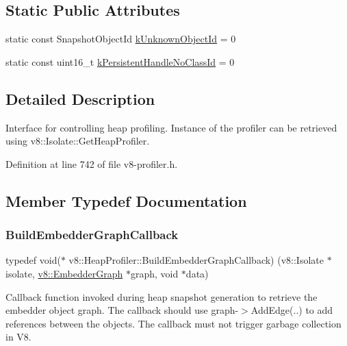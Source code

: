 \subsection*{Static Public Attributes}
\begin{DoxyCompactItemize}
\item 
static const Snapshot\+Object\+Id \mbox{\hyperlink{classv8_1_1HeapProfiler_abf2b9d8facb18473f9b124ab8baf5786}{k\+Unknown\+Object\+Id}} = 0
\item 
static const uint16\+\_\+t \mbox{\hyperlink{classv8_1_1HeapProfiler_a272c9af3ea5cd90a2737af3d22a7eb78}{k\+Persistent\+Handle\+No\+Class\+Id}} = 0
\end{DoxyCompactItemize}


\subsection{Detailed Description}
Interface for controlling heap profiling. Instance of the profiler can be retrieved using v8\+::\+Isolate\+::\+Get\+Heap\+Profiler. 

Definition at line 742 of file v8-\/profiler.\+h.



\subsection{Member Typedef Documentation}
\mbox{\label{classv8_1_1HeapProfiler_a29c98afa5ce0ea543eef904201bc3e40}} 
\subsubsection{\texorpdfstring{Build\+Embedder\+Graph\+Callback}{BuildEmbedderGraphCallback}}
{\footnotesize\ttfamily typedef void($\ast$ v8\+::\+Heap\+Profiler\+::\+Build\+Embedder\+Graph\+Callback) (v8\+::\+Isolate $\ast$isolate, \mbox{\hyperlink{classv8_1_1EmbedderGraph}{v8\+::\+Embedder\+Graph}} $\ast$graph, void $\ast$data)}

Callback function invoked during heap snapshot generation to retrieve the embedder object graph. The callback should use graph-\/$>$Add\+Edge(..) to add references between the objects. The callback must not trigger garbage collection in V8. 

